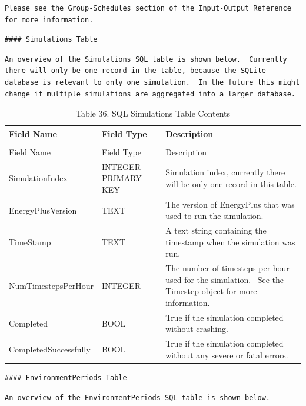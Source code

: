 \begin{lstlisting}
Please see the Group-Schedules section of the Input-Output Reference for more information.
\end{lstlisting}

\begin{lstlisting}
#### Simulations Table
\end{lstlisting}

\begin{lstlisting}
An overview of the Simulations SQL table is shown below.  Currently there will only be one record in the table, because the SQLite database is relevant to only one simulation.  In the future this might change if multiple simulations are aggregated into a larger database.
\end{lstlisting}

\begin{longtable}[c]{p{1.5in}p{1.5in}p{3.0in}}
\caption{Table 36. SQL Simulations Table Contents \label{table:table-36.-sql-simulations-table-contents}} \tabularnewline
\toprule 
Field Name & Field Type & Description \tabularnewline
\midrule
\endfirsthead

\caption[]{Table 36. SQL Simulations Table Contents} \tabularnewline
\toprule 
Field Name & Field Type & Description \tabularnewline
\midrule
\endhead

SimulationIndex & INTEGER PRIMARY KEY & Simulation index, currently there will be only one record in this table. \tabularnewline
EnergyPlusVersion & TEXT & The version of EnergyPlus that was used to run the simulation. \tabularnewline
TimeStamp & TEXT & A text string containing the timestamp when the simulation was run. \tabularnewline
NumTimestepsPerHour & INTEGER & The number of timesteps per hour used for the simulation.~ See the Timestep object for more information. \tabularnewline
Completed & BOOL & True if the simulation completed without crashing. \tabularnewline
CompletedSuccessfully & BOOL & True if the simulation completed without any severe or fatal errors. \tabularnewline
\bottomrule
\end{longtable}

\begin{lstlisting}
#### EnvironmentPeriods Table
\end{lstlisting}

\begin{lstlisting}
An overview of the EnvironmentPeriods SQL table is shown below.
\end{lstlisting}

